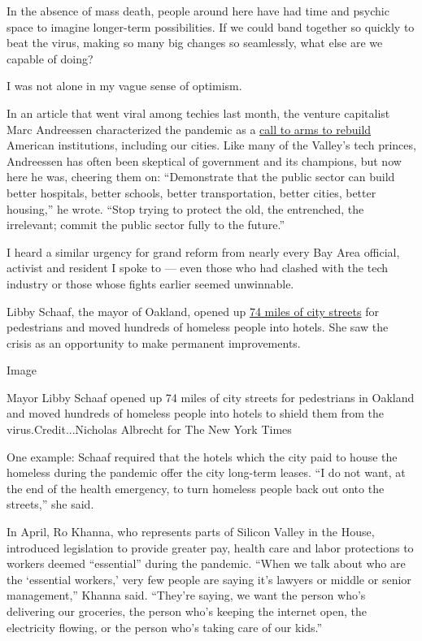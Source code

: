 In the absence of mass death, people around here have had time and
psychic space to imagine longer-term possibilities. If we could band
together so quickly to beat the virus, making so many big changes so
seamlessly, what else are we capable of doing?

I was not alone in my vague sense of optimism.

In an article that went viral among techies last month, the venture
capitalist Marc Andreessen characterized the pandemic as a
\href{https://a16z.com/2020/04/18/its-time-to-build/}{call to arms to
rebuild} American institutions, including our cities. Like many of the
Valley's tech princes, Andreessen has often been skeptical of government
and its champions, but now here he was, cheering them on: ``Demonstrate
that the public sector can build better hospitals, better schools,
better transportation, better cities, better housing,'' he wrote. ``Stop
trying to protect the old, the entrenched, the irrelevant; commit the
public sector fully to the future.''

I heard a similar urgency for grand reform from nearly every Bay Area
official, activist and resident I spoke to --- even those who had
clashed with the tech industry or those whose fights earlier seemed
unwinnable.

Libby Schaaf, the mayor of Oakland, opened up
\href{https://www.citylab.com/transportation/2020/04/slow-streets-oakland-car-free-roads-pedestrians-covid-19/609961/}{74
miles of city streets} for pedestrians and moved hundreds of homeless
people into hotels. She saw the crisis as an opportunity to make
permanent improvements.

Image

Mayor Libby Schaaf opened up 74 miles of city streets for pedestrians in
Oakland and moved hundreds of homeless people into hotels to shield them
from the virus.Credit...Nicholas Albrecht for The New York Times

One example: Schaaf required that the hotels which the city paid to
house the homeless during the pandemic offer the city long-term leases.
``I do not want, at the end of the health emergency, to turn homeless
people back out onto the streets,'' she said.

In April, Ro Khanna, who represents parts of Silicon Valley in the
House, introduced legislation to provide greater pay, health care and
labor protections to workers deemed ``essential'' during the pandemic.
``When we talk about who are the `essential workers,' very few people
are saying it's lawyers or middle or senior management,'' Khanna said.
``They're saying, we want the person who's delivering our groceries, the
person who's keeping the internet open, the electricity flowing, or the
person who's taking care of our kids.''

